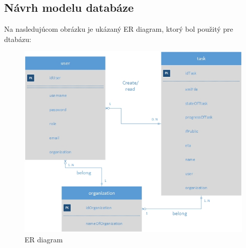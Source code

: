 \subsection{Návrh modelu databáze}
Na nasledujúcom obrázku je ukázaný ER diagram, ktorý bol použitý pre dtabázu:
\begin{figure}[htb]

\begin{center}

\includegraphics[scale=0.7]{ER.jpg} 
\caption{ER diagram}
\label{ER}

\end{center}

\end{figure}

